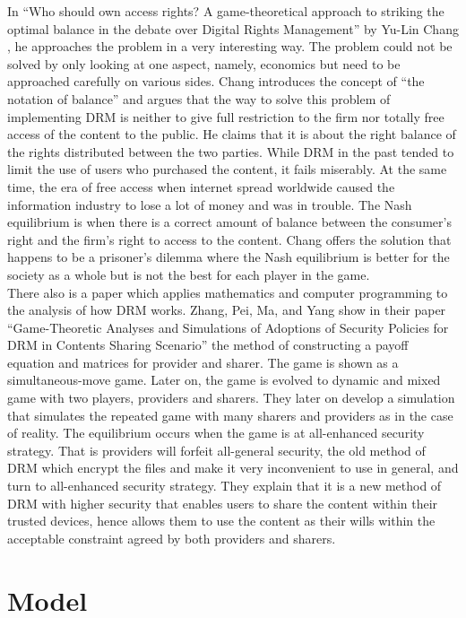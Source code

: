 \documentclass[letter,12pt]{article}
\numberwithin{equation}{section}
\begin{document}
In ``Who should own access rights? A game-theoretical approach to striking the optimal balance in the debate over Digital Rights Management'' by Yu-Lin Chang \cite{chang2007}, he approaches the problem in a very interesting way. The problem could not be solved by only looking at one aspect, namely, economics but need to be approached carefully on various sides. Chang introduces the concept of ``the notation of balance'' and argues that the way to solve this problem of implementing DRM is neither to give full restriction to the firm nor totally free access of the content to the public. He claims that it is about the right balance of the rights distributed between the two parties. While DRM in the past tended to limit the use of users who purchased the content, it fails miserably. At the same time, the era of free access when internet spread worldwide caused the information industry to lose a lot of money and was in trouble. The Nash equilibrium is when there is a correct amount of balance between the consumer’s right and the firm’s right to access to the content. Chang offers the solution that happens to be a prisoner’s dilemma where the Nash equilibrium is better for the society as a whole but is not the best for each player in the game.\\

There also is a paper which applies mathematics and computer programming to the analysis of how DRM works. Zhang, Pei, Ma, and Yang show in their paper ``Game-Theoretic Analyses and Simulations of Adoptions of Security Policies for DRM in Contents Sharing Scenario'' \cite{zhang2011} the method of constructing a payoff equation and matrices for provider and sharer. The game is shown as a simultaneous-move game. Later on, the game is evolved to dynamic and mixed game with two players, providers and sharers. They later on develop a simulation that simulates the repeated game with many sharers and providers as in the case of reality. The equilibrium occurs when the game is at all-enhanced security strategy. That is providers will forfeit all-general security, the old method of DRM which encrypt the files and make it very inconvenient to use in general, and turn to all-enhanced security strategy. They explain that it is a new method of DRM with higher security that enables users to share the content within their trusted devices, hence allows them to use the content as their wills within the acceptable constraint agreed by both providers and sharers.

\section{Model}
\end{document}
